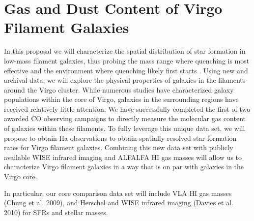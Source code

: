\documentclass[11pt, preprint]{aastex}
\begin{document}
\vspace*{-.8cm}
\section{Gas and Dust Content of Virgo Filament Galaxies}
\vspace*{-.4cm}
In this proposal we will characterize the spatial distribution of star formation in
 low-mass filament galaxies, thus probing the mass range where quenching
 is most effective and the environment where quenching likely first starts \citep[e.g.][]{cybulski14}. 
 Using new and archival data, we will explore the physical properties of
galaxies in the filaments around the Virgo cluster.   
While numerous studies have characterized galaxy populations within the core of Virgo, galaxies in the surrounding regions have received relatively little attention.
%
We have successfully completed the first of two awarded CO observing campaigns to directly measure the molecular gas content of galaxies within these filaments. To fully leverage this unique data set, we will propose to obtain Ha observations to obtain spatially resolved star formation rates for Virgo filament galaxies. Combining this new data set with publicly available WISE infrared imaging  and ALFALFA HI gas masses will allow us to characterize Virgo filament galaxies in a way that is on par with galaxies in the Virgo core. 

In particular, our core comparison data set will include VLA HI gas masses (Chung et al. 2009), and Herschel and WISE infrared imaging (Davies et al. 2010) for SFRs and stellar masses.  

\end{document}
